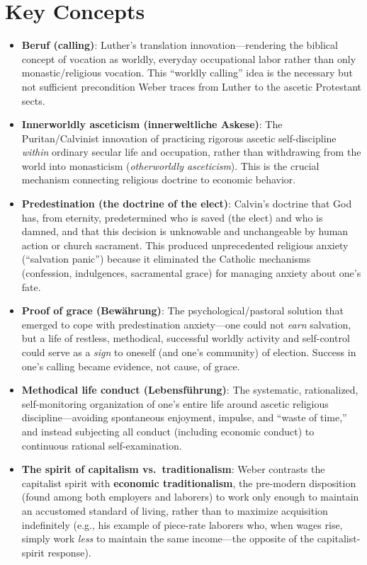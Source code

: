 \documentclass[12pt]{article}
\begin{document}
\section{Key Concepts}

\begin{itemize}[leftmargin=*, itemsep=4pt]
    \item \textbf{Beruf (calling)}: Luther's translation innovation---rendering the biblical concept of vocation as worldly, everyday occupational labor rather than only monastic/religious vocation. This ``worldly calling'' idea is the necessary but not sufficient precondition Weber traces from Luther to the ascetic Protestant sects.
    \item \textbf{Innerworldly asceticism (innerweltliche Askese)}: The Puritan/Calvinist innovation of practicing rigorous ascetic self-discipline \emph{within} ordinary secular life and occupation, rather than withdrawing from the world into monasticism (\textit{otherworldly asceticism}). This is the crucial mechanism connecting religious doctrine to economic behavior.
    \item \textbf{Predestination (the doctrine of the elect)}: Calvin's doctrine that God has, from eternity, predetermined who is saved (the elect) and who is damned, and that this decision is unknowable and unchangeable by human action or church sacrament. This produced unprecedented religious anxiety (``salvation panic'') because it eliminated the Catholic mechanisms (confession, indulgences, sacramental grace) for managing anxiety about one's fate.
    \item \textbf{Proof of grace (Bewährung)}: The psychological/pastoral solution that emerged to cope with predestination anxiety---one could not \emph{earn} salvation, but a life of restless, methodical, successful worldly activity and self-control could serve as a \emph{sign} to oneself (and one's community) of election. Success in one's calling became evidence, not cause, of grace.
    \item \textbf{Methodical life conduct (Lebensf\"uhrung)}: The systematic, rationalized, self-monitoring organization of one's entire life around ascetic religious discipline---avoiding spontaneous enjoyment, impulse, and ``waste of time,'' and instead subjecting all conduct (including economic conduct) to continuous rational self-examination.
    \item \textbf{The spirit of capitalism vs.\ traditionalism}: Weber contrasts the capitalist spirit with \textbf{economic traditionalism}, the pre-modern disposition (found among both employers and laborers) to work only enough to maintain an accustomed standard of living, rather than to maximize acquisition indefinitely (e.g., his example of piece-rate laborers who, when wages rise, simply work \emph{less} to maintain the same income---the opposite of the capitalist-spirit response).

\end{itemize}
\end{document}
